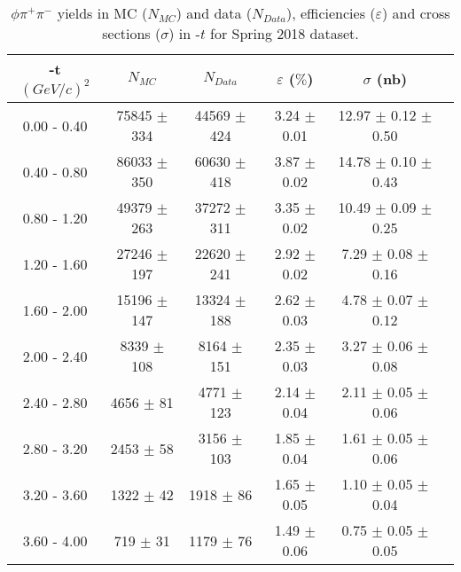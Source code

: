 \begin{center}
    \null
    \vfill
\begin{table}[H]
    \caption{$\phi \pi^{+}\pi^{-}$ yields in MC ($N_{MC}$) and data ($N_{Data}$), efficiencies ($\varepsilon$) and cross sections ($\sigma$) in -$t$ for Spring 2018 dataset.}
    \label{tab.y2175.xsec_ul.phi2pi.3.2}
    \begin{tabular}{|c|c|c|c|c|c|}
    \hline
    -t $(GeV/c)^{2}$ & $N_{MC}$ & $N_{Data}$ & $\varepsilon$ ($\%$) & $\sigma$ (nb) \\ 
    \hline
    0.00 - 0.40 & 75845 $\pm$ 334 & 44569 $\pm$ 424 & 3.24 $\pm$ 0.01 & 12.97 $\pm$ 0.12 $\pm$ 0.50 \\ 
    0.40 - 0.80 & 86033 $\pm$ 350 & 60630 $\pm$ 418 & 3.87 $\pm$ 0.02 & 14.78 $\pm$ 0.10 $\pm$ 0.43 \\ 
    0.80 - 1.20 & 49379 $\pm$ 263 & 37272 $\pm$ 311 & 3.35 $\pm$ 0.02 & 10.49 $\pm$ 0.09 $\pm$ 0.25 \\ 
    1.20 - 1.60 & 27246 $\pm$ 197 & 22620 $\pm$ 241 & 2.92 $\pm$ 0.02 & 7.29 $\pm$ 0.08 $\pm$ 0.16 \\ 
    1.60 - 2.00 & 15196 $\pm$ 147 & 13324 $\pm$ 188 & 2.62 $\pm$ 0.03 & 4.78 $\pm$ 0.07 $\pm$ 0.12 \\ 
    2.00 - 2.40 & 8339 $\pm$ 108 & 8164 $\pm$ 151 & 2.35 $\pm$ 0.03 & 3.27 $\pm$ 0.06 $\pm$ 0.08 \\ 
    2.40 - 2.80 & 4656 $\pm$ 81 & 4771 $\pm$ 123 & 2.14 $\pm$ 0.04 & 2.11 $\pm$ 0.05 $\pm$ 0.06 \\ 
    2.80 - 3.20 & 2453 $\pm$ 58 & 3156 $\pm$ 103 & 1.85 $\pm$ 0.04 & 1.61 $\pm$ 0.05 $\pm$ 0.06 \\ 
    3.20 - 3.60 & 1322 $\pm$ 42 & 1918 $\pm$ 86 & 1.65 $\pm$ 0.05 & 1.10 $\pm$ 0.05 $\pm$ 0.04 \\ 
    3.60 - 4.00 & 719 $\pm$ 31 & 1179 $\pm$ 76 & 1.49 $\pm$ 0.06 & 0.75 $\pm$ 0.05 $\pm$ 0.05 \\ 
   \hline
\end{tabular}
\end{table}
\end{center}
 
